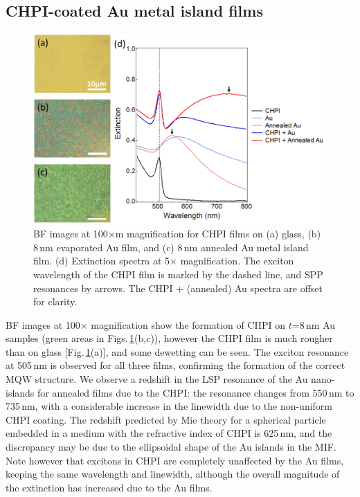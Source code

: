 \subsection{CHPI-coated Au metal island films}
\begin{figure}[ht] 
\centering    
\includegraphics[width=\textwidth]{Fig3}
\caption{BF images at 100$\times$m magnification for CHPI films on (a) glass, (b) 8\,nm evaporated Au film, and (c) 8\,nm annealed Au metal island film. (d) Extinction spectra at 5$\times$ magnification. The exciton wavelength of the CHPI film is marked by the dashed line, and SPP resonances by arrows. The CHPI + (annealed) Au spectra are offset for clarity.}
\label{6Fig3}
\end{figure}
BF images at 100$\times$ magnification show the formation of CHPI on $t$=8\,nm Au samples (green areas in Figs.\,\ref{6Fig3}(b,c)), however the CHPI film is much rougher than on glass [Fig.\,\ref{6Fig3}(a)], and some dewetting can be seen. The exciton resonance at 505\,nm is observed for all three films, confirming the formation of the correct MQW structure. We observe a redshift in the LSP resonance of the Au nano-islands for annealed films due to the CHPI: the resonance changes from 550\,nm to 735\,nm, with a considerable increase in the linewidth due to the non-uniform CHPI coating. The redshift predicted by Mie theory for a spherical particle embedded in a medium with the refractive index of CHPI is 625\,nm, and the discrepancy may be due to the ellipsoidal shape of the Au islands in the MIF. Note however that excitons in CHPI are completely unaffected by the Au films, keeping the same wavelength and linewidth, although the overall magnitude of the extinction has increased due to the Au films.

